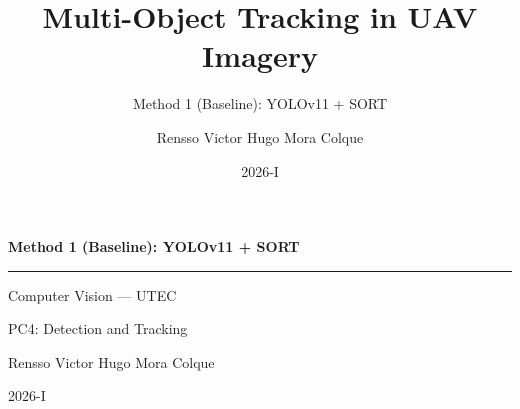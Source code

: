 \documentclass[aspectratio=169]{beamer}
\title{Multi-Object Tracking in UAV Imagery}
\subtitle{Method 1 (Baseline): YOLOv11 + SORT}
\author{Rensso Victor Hugo Mora Colque}
\institute{Computer Vision --- UTEC}
\date{2026-I}
\begin{document}

{
\begin{frame}[plain]
  \vspace{1.2cm}
  \centering
  {\color{utecblue}\Large\bfseries Method 1 (Baseline): YOLOv11 + SORT\par}
  \vspace{0.4em}
  \color{utecblue!50}\rule{0.5\textwidth}{0.4pt}\par
  \vspace{0.8em}
  {\color{utecblue!80}\small Computer Vision --- UTEC\par}
  {\color{utecblue!80}\small PC4: Detection and Tracking\par}
  \vspace{0.4em}
  {\color{utecblue!70}\small Rensso Victor Hugo Mora Colque\par}
  {\color{utecblue!60}\small 2026-I\par}
\end{frame}
}



















\end{document}
